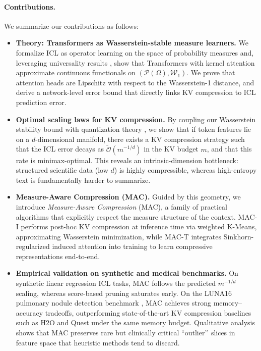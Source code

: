 \documentclass{article}
\theoremstyle{plain}
\theoremstyle{definition}
\theoremstyle{remark}
\begin{document}
\paragraph{Contributions.}
We summarize our contributions as follows:
\begin{itemize}[leftmargin=*,noitemsep,topsep=2pt]
    \item \textbf{Theory: Transformers as Wasserstein-stable measure learners.} We formalize ICL as operator learning on the space of probability measures and, leveraging universality results \citep{furuya2025transformers}, show that Transformers with kernel attention approximate continuous functionals on $(\mathcal{P}(\Omega),\mathcal{W}_1)$. We prove that attention heads are Lipschitz with respect to the Wasserstein-1 distance, and derive a network-level error bound that directly links KV compression to ICL prediction error.
    \item \textbf{Optimal scaling laws for KV compression.} By coupling our Wasserstein stability bound with quantization theory \citep{graf2000foundations}, we show that if token features lie on a $d$-dimensional manifold, there exists a KV compression strategy such that the ICL error decays as $\tilde{\mathcal{O}}(m^{-1/d})$ in the KV budget $m$, and that this rate is minimax-optimal. This reveals an intrinsic-dimension bottleneck: structured scientific data (low $d$) is highly compressible, whereas high-entropy text is fundamentally harder to summarize.
    \item \textbf{Measure-Aware Compression (MAC).} Guided by this geometry, we introduce \emph{Measure-Aware Compression} (MAC), a family of practical algorithms that explicitly respect the measure structure of the context. MAC-I performs post-hoc KV compression at inference time via weighted K-Means, approximating Wasserstein minimization, while MAC-T integrates Sinkhorn-regularized induced attention \citep{cuturi2013sinkhorn,lee2019set} into training to learn compressive representations end-to-end.
    \item \textbf{Empirical validation on synthetic and medical benchmarks.} On synthetic linear regression ICL tasks, MAC follows the predicted $m^{-1/d}$ scaling, whereas score-based pruning saturates early. On the LUNA16 pulmonary nodule detection benchmark \citep{setio2017validation}, MAC achieves strong memory--accuracy tradeoffs, outperforming state-of-the-art KV compression baselines such as H2O and Quest \citep{zhang2024h2o,tang2024quest} under the same memory budget. Qualitative analysis shows that MAC preserves rare but clinically critical “outlier’’ slices in feature space that heuristic methods tend to discard.
\end{itemize}
\end{document}
